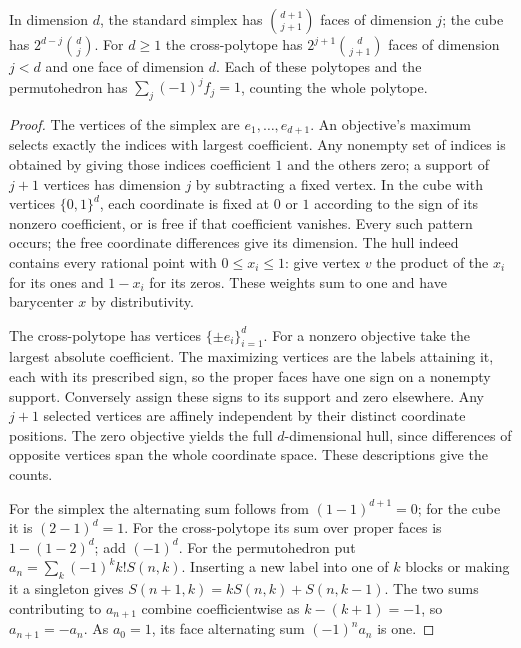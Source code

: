 \begin{proposition}\label{result57}
In dimension \(d\), the standard simplex has \(\binom{d+1}{j+1}\)
faces of dimension \(j\); the cube has \(2^{d-j}\binom dj\). For
\(d\ge1\) the cross-polytope has \(2^{j+1}\binom d{j+1}\) faces of
dimension \(j<d\) and one face of dimension \(d\). Each of these
polytopes and the permutohedron has
\(\sum_j(-1)^j f_j=1\), counting the whole polytope.
\end{proposition}
\begin{proof}
The vertices of the simplex are \(e_1,\ldots,e_{d+1}\). An objective's
maximum selects exactly the indices with largest coefficient. Any
nonempty set of indices is obtained by giving those indices coefficient
\(1\) and the others zero; a support of \(j+1\) vertices has dimension
\(j\) by subtracting a fixed vertex. In the cube with vertices
\(\{0,1\}^d\), each coordinate is fixed at \(0\) or \(1\) according
to the sign of its nonzero coefficient, or is free if that coefficient
vanishes. Every such pattern occurs; the free coordinate differences give
its dimension. The hull indeed contains every rational point with
\(0\le x_i\le1\): give vertex \(v\) the product of the \(x_i\) for
its ones and \(1-x_i\) for its zeros. These weights sum to one and have
barycenter \(x\) by distributivity.

The cross-polytope has vertices \(\{\pm e_i\}_{i=1}^d\). For a nonzero
objective take the largest absolute coefficient. The maximizing vertices
are the labels attaining it, each with its prescribed sign, so the
proper faces have one sign on a nonempty support. Conversely assign
these signs to its support and zero elsewhere. Any \(j+1\) selected
vertices are affinely independent by their distinct coordinate positions.
The zero objective yields the full \(d\)-dimensional hull, since differences
of opposite vertices span the whole coordinate space. These descriptions
give the counts.

For the simplex the alternating sum follows from \((1-1)^{d+1}=0\);
for the cube it is \((2-1)^d=1\). For the cross-polytope its sum over
proper faces is \(1-(1-2)^d\); add \((-1)^d\). For the permutohedron
put \(a_n=\sum_k(-1)^k k!S(n,k)\). Inserting a new label into one of
\(k\) blocks or making it a singleton gives
\(S(n+1,k)=kS(n,k)+S(n,k-1)\). The two sums contributing to \(a_{n+1}\)
combine coefficientwise as \(k-(k+1)=-1\), so \(a_{n+1}=-a_n\).
As \(a_0=1\), its face alternating sum \((-1)^na_n\) is one.
\end{proof}

